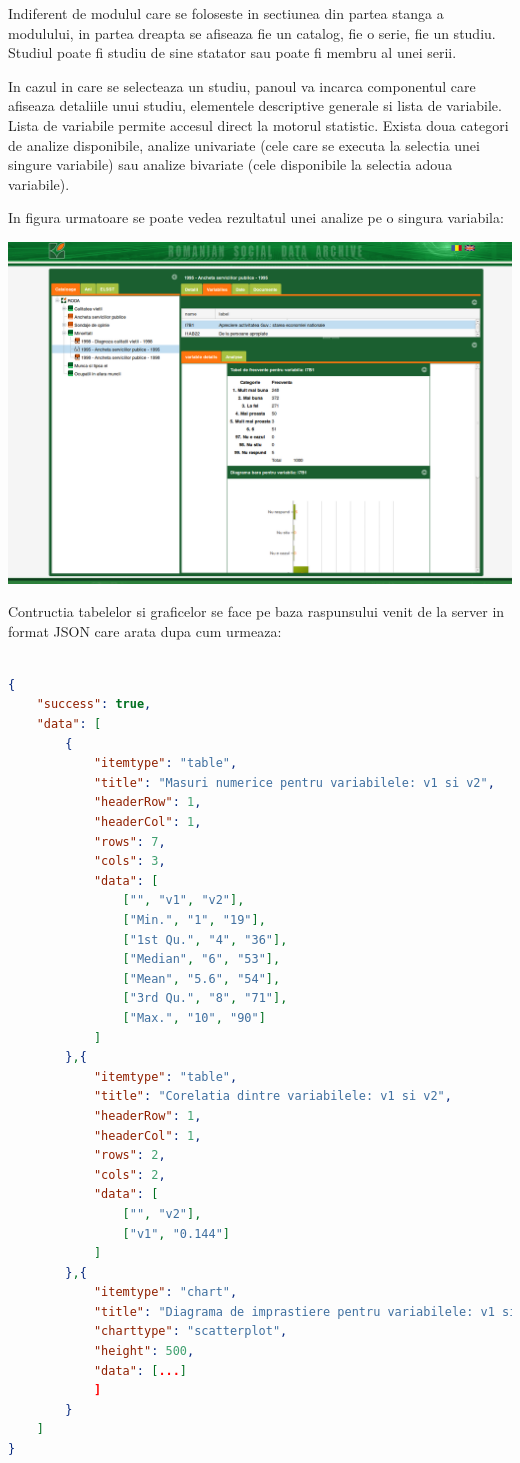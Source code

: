 Indiferent de modulul care se foloseste in sectiunea din partea stanga a modulului, in partea dreapta se afiseaza fie un catalog, fie o serie, fie un studiu. Studiul poate fi studiu de sine statator sau poate fi membru al unei serii. 

In cazul in care se selecteaza un studiu, panoul va incarca componentul care afiseaza detaliile unui studiu, elementele descriptive generale si lista de variabile. Lista de variabile permite accesul direct la motorul statistic. Exista doua categori de analize disponibile, analize univariate (cele care se executa la selectia unei singure variabile) sau analize bivariate (cele disponibile la selectia adoua variabile). 

In figura urmatoare se poate vedea rezultatul unei analize pe o singura variabila:

\includegraphics[width=16cm]{img/Screenshot-statistics}

Contructia tabelelor si graficelor se face pe baza raspunsului venit de la server in format JSON care arata dupa cum urmeaza:


\begin{lstlisting}[language=json]

{
    "success": true,
    "data": [
        {
            "itemtype": "table",
            "title": "Masuri numerice pentru variabilele: v1 si v2",
            "headerRow": 1,
            "headerCol": 1,
            "rows": 7,
            "cols": 3,
            "data": [
                ["", "v1", "v2"],
                ["Min.", "1", "19"],
                ["1st Qu.", "4", "36"],
                ["Median", "6", "53"],
                ["Mean", "5.6", "54"],
                ["3rd Qu.", "8", "71"],
                ["Max.", "10", "90"]
            ]
        },{
            "itemtype": "table",
            "title": "Corelatia dintre variabilele: v1 si v2",
            "headerRow": 1,
            "headerCol": 1,
            "rows": 2,
            "cols": 2,
            "data": [
                ["", "v2"],
                ["v1", "0.144"]
            ]
        },{
            "itemtype": "chart",
            "title": "Diagrama de imprastiere pentru variabilele: v1 si v2",
            "charttype": "scatterplot",
            "height": 500,
            "data": [...]
            ]
        }
    ]
}
\end{lstlisting}

